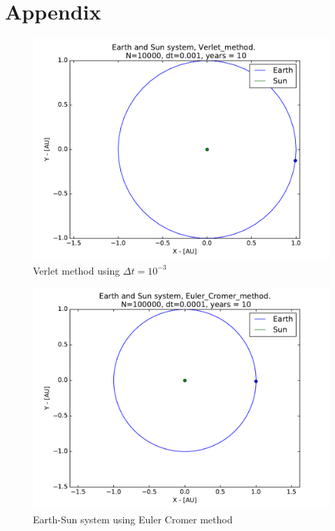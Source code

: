 \documentclass{article}
\begin{document}
\section{Appendix}
\begin{figure}[!h]
\centering
\includegraphics[width=\linewidth]{Plots/Earth_Sun_Verlet_method_larger_dt.pdf}
\caption{Verlet method using $\Delta t = 10^{-3}$}
\label{fig:balle3}
\end{figure}
\begin{figure}[!h]
\centering
\includegraphics[width=\linewidth]{Plots/Earth_Sun_Euler_Cromer_method.pdf}
\caption{Earth-Sun system using Euler Cromer method}
\label{fig:Appendix_EulerCromer}
\end{figure}
\end{document}
